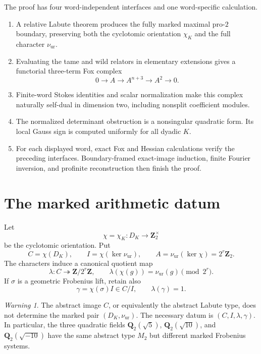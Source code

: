 \documentclass[11pt,reqno]{amsart}
\theoremstyle{definition}
\theoremstyle{remark}
\newtheorem{warning}[theorem]{Warning}
\numberwithin{equation}{section}
\newcommand{\Q}{\mathbf Q}
\newcommand{\Z}{\mathbf Z}
\newcommand{\ur}{\mathrm{ur}}
\begin{document}
The proof has four word-independent interfaces and one word-specific
calculation.
\begin{enumerate}
\item A relative Labute theorem produces the fully marked maximal
pro-\(2\) boundary, preserving both the cyclotomic orientation
\(\chi_K\) and the full character \(\nu_{\ur}\).
\item Evaluating the tame and wild relators in elementary extensions
gives a functorial three-term Fox complex
\[
 0\longrightarrow A\longrightarrow A^{n+3}
   \longrightarrow A^2\longrightarrow0.
\]
\item Finite-word Stokes identities and scalar normalization make this
complex naturally self-dual in dimension two, including nonsplit
coefficient modules.
\item The normalized determinant obstruction is a nonsingular
quadratic form.  Its local Gauss sign is computed uniformly for all
dyadic \(K\).
\item For each displayed word, exact Fox and Hessian calculations verify
the preceding interfaces.  Boundary-framed exact-image induction,
finite Fourier inversion, and profinite reconstruction then finish the
proof.
\end{enumerate}

\section{The marked arithmetic datum}\label{sec:marked-data}

Let
\[
 \chi=\chi_K:D_K\longrightarrow\Z_2^\times
\]
be the cyclotomic orientation.  Put
\begin{equation}\label{eq:CI}
 C=\chi(D_K),\qquad I=\chi(\ker\nu_{\ur}),\qquad
 A=\nu_{\ur}(\ker\chi)=2^r\Z_2.
\end{equation}
The characters induce a canonical quotient map
\begin{equation}\label{eq:lambda}
 \lambda:C\twoheadrightarrow\Z/2^r\Z,\qquad
 \lambda(\chi(g))=\nu_{\ur}(g)\pmod{2^r}.
\end{equation}
If \(\sigma\) is a geometric Frobenius lift, retain also
\begin{equation}\label{eq:gamma}
 \gamma=\chi(\sigma)I\in C/I,\qquad \lambda(\gamma)=1.
\end{equation}

\begin{warning}
The abstract image \(C\), or equivalently the abstract Labute type, does
not determine the marked pair \((D_K,\nu_{\ur})\).  The necessary datum
is \((C,I,\lambda,\gamma)\).  In particular, the three quadratic fields
\(\Q_2(\sqrt5)\), \(\Q_2(\sqrt{10})\), and
\(\Q_2(\sqrt{-10})\) have the same abstract type \(M_2\) but different
marked Frobenius systems.
\end{warning}
\end{document}
